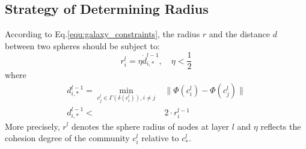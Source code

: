 \documentclass{article}
\theoremstyle{definition}
\begin{document}
	 \subsection{Strategy of Determining Radius}
	 According to Eq.\ref{equ:galaxy_constraints}, the radius $r$ and the distance $d$ between two spheres should be subject to:
	 \begin{equation}
	 	\label{equ:r_and_eta}
	 	r_i^l= \eta \dot d_{i, *}^{l-1}, \quad \eta < \frac{1}{2}
	 \end{equation}
	 where
 	 \begin{align}
 		\label{equ:mind}
 		d_{i,*}^{l-1} = \min_{c^{l}_j \in \Gamma(\delta(c^{l}_i)), i \neq j}& \lVert\Phi(c_i^{l}) - \Phi(c_j^{l})\rVert \\
 		\label{equ:d_and_r}
 		d_{i,*}^{l-1} <& 2 \cdot r_i^{l-1}
 	\end{align}
 	More precisely, $r^l$ denotes the sphere radius of nodes at layer $l$ and $\eta$ reflects the cohesion degree of the community $c_i^l$ relative to $c_*^l$.
\end{document}
